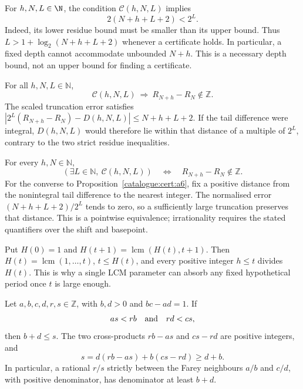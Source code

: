 \begin{lem}\label{catalogue:cert:a5}
For $h,N,L\in\N$, the condition $\mathcal C(h,N,L)$ implies
\[
 2(N+h+L+2)<2^L.
\]
Indeed, its lower residue bound must be smaller than its upper bound.
Thus $L>1+\log_2(N+h+L+2)$ whenever a certificate holds. In
particular, a fixed depth cannot accommodate unbounded $N+h$.
This is a necessary depth bound, not an upper bound for finding a
certificate.
\end{lem}

\begin{prop}\label{catalogue:cert:a6}
For all $h,N,L\in\mathbb N$,
\[
 \mathcal C(h,N,L)\ \Longrightarrow\ R_{N+h}-R_N\notin\mathbb Z.
\]
The scaled truncation error satisfies
$|2^L(R_{N+h}-R_N)-D(h,N,L)|\le N+h+L+2$.
If the tail difference
were integral, $D(h,N,L)$ would therefore lie within that distance of a
multiple of $2^L$, contrary to the two strict residue inequalities.
\end{prop}

\begin{thm}\label{catalogue:cert:a7}
For every $h,N\in\mathbb N$,
\[
 (\exists L\in\mathbb N,\ \mathcal C(h,N,L))
 \quad\Longleftrightarrow\quad R_{N+h}-R_N\notin\mathbb Z.
\]
For the converse to Proposition~\ref{catalogue:cert:a6}, fix a positive
distance from the nonintegral tail difference to the nearest integer.
The normalised error $(N+h+L+2)/2^L$ tends to zero, so a sufficiently
large truncation preserves that distance. This is a pointwise
equivalence; irrationality requires the stated quantifiers over the
shift and basepoint.
\end{thm}

\begin{defn}\label{catalogue:cert:b1}
Put $H(0)=1$ and $H(t+1)=\operatorname{lcm}(H(t),t+1)$. Then
$H(t)=\operatorname{lcm}(1,\ldots,t)$, $t\le H(t)$, and every positive
integer $h\le t$ divides $H(t)$. This is why a single LCM parameter can
absorb any fixed hypothetical period once $t$ is large enough.
\end{defn}

\begin{prop}\label{catalogue:cert:c1}
Let $a,b,c,d,r,s\in\mathbb Z$, with $b,d>0$ and $bc-ad=1$. If
\[
 as<rb\quad\hbox{and}\quad rd<cs,
\]
then $b+d\le s$. The two cross-products $rb-as$ and $cs-rd$ are positive
integers, and
\[
 s=d(rb-as)+b(cs-rd)\ge d+b.
\]
In particular, a rational $r/s$ strictly between the Farey neighbours
$a/b$ and $c/d$, with positive denominator, has denominator at least
$b+d$.
\end{prop}

